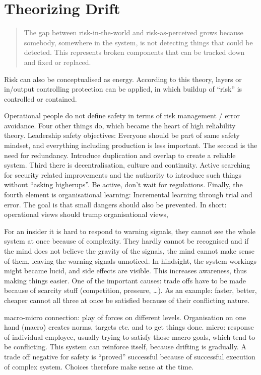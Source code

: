 \section{Theorizing Drift}
\begin{quote}
The gap between risk-in-the-world and risk-as-perceived grows because somebody, somewhere in the system, is not detecting things that could be detected. 
This represents broken components that can be tracked down and fixed or replaced.
\end{quote}

Risk can also be conceptualised as energy. 
According to this theory, layers or in/output controlling protection can be applied, in which buildup of ``risk'' is controlled or contained. 

Operational people do not define safety in terms of risk management / error avoidance. Four other things do, which became the heart of high reliability theory. 
Leadership safety objectives: Everyone should be part of same safety mindset, and everything including production is less important.
The second is the need for redundancy. Introduce duplication and overlap to create a reliable system.
Third there is decentralisation, culture and continuity. Active searching for security related improvements and the authority to introduce such things without ``asking higherups''. 
Be active, don't wait for regulations.
Finally, the fourth element is organisational learning: Incremental learning through trial and error. 
The goal is that small dangers should also be prevented.
In short: operational views should trump organisational views,

For an insider it is hard to respond to warning signals, they cannot see the whole system at once because of complexity. 
They hardly cannot be recognised and if the mind does not believe the gravity of the signals, the mind cannot make sense of them, leaving the warning signals unnoticed. 
In hindsight, the system workings might became lucid, and side effects are visible. 
This increases awareness, thus making things easier.
One of the important causes: trade offs have to be made because of scarcity stuff (competition, pressure, \ldots). 
As an example: faster, better, cheaper cannot all three at once be satisfied because of their conflicting nature.

macro-micro connection: play of forces on different levels. Organisation on one hand (macro) creates norms, targets etc. and to get things done. 
micro: response of individual employee, usually trying to satisfy those macro goals, which tend to be conflicting.
This system can reinforce itself, because drifting is gradually. 
A trade off negative for safety is ``proved'' successful because of successful execution of complex system.
Choices therefore make sense at the time.


